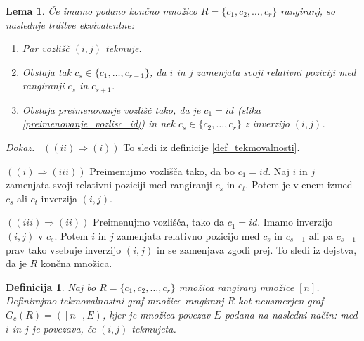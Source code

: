 \documentclass[a4paper, 12pt]{book}
\newtheorem{definicija}{Definicija}[chapter]
\newtheorem{lema}{Lema}[chapter]
\newenvironment{dokaz}{\emph{Dokaz.}\ }{\hspace{\fill}{$\Box$}}
\begin{document}
\begin{lema}
    Če imamo podano končno množico $R = \{ c_1, c_2, \dots, c_r \}$ rangiranj, so naslednje trditve ekvivalentne:
    \begin{enumerate}[label=(\roman*)]
        \item Par vozlišč $(i, j)$ tekmuje.
        \item Obstaja tak $c_s \in \{ c_1, \dots, c_{r-1} \}$, da $i$ in $j$ zamenjata svoji relativni poziciji med rangiranji $c_s$ in $c_{s+1}$.
        \item Obstaja preimenovanje vozlišč tako, da je $c_1 = id$ (slika \ref{preimenovanje_vozlisc_id}) in nek $c_s \in \{c_2, \dots, c_r\}$ z inverzijo $(i, j)$.
    \end{enumerate}
\end{lema}
\begin{dokaz}
    $((ii) \Rightarrow (i))$ To sledi iz definicije \ref{def_tekmovalnosti}. 
    
    $((i) \Rightarrow (iii))$ Preimenujmo vozlišča tako, da bo $c_1 = id$. Naj $i$ in $j$ zamenjata svoji relativni poziciji med rangiranji $c_s$ in $c_t$. Potem je v enem izmed $c_s$ ali $c_t$ inverzija $(i, j)$. 
    
    $((iii) \Rightarrow (ii))$ Preimenujmo vozlišča, tako da $c_1 = id$. Imamo inverzijo $(i, j)$ v $c_s$. Potem $i$ in $j$ zamenjata relativno pozicijo med $c_s$ in $c_{s-1}$ ali pa $c_{s-1}$ prav tako vsebuje inverzijo $(i, j)$ in se zamenjava zgodi prej. To sledi iz dejstva, da je $R$ končna množica.
\end{dokaz}

\begin{definicija}
    Naj bo $R = \{ c_1, c_2, \dots, c_r \}$ množica rangiranj množice $[n]$. Definirajmo tekmovalnostni graf množice rangiranj $R$ kot neusmerjen graf $G_c(R) = ([n], E)$, kjer je množica povezav $E$ podana na nasledni način: med $i$ in $j$ je povezava, če $(i, j)$ tekmujeta.
\end{definicija}
\end{document}
